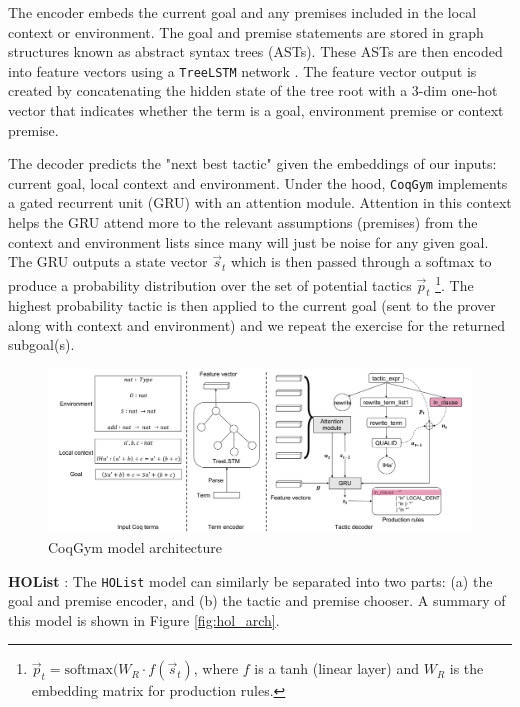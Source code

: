 \documentclass{article}
\begin{document}
The encoder embeds the current goal and any premises included in the local context or environment. The goal and premise statements are stored in graph structures known as abstract syntax trees (ASTs). These ASTs are then encoded into feature vectors using a \texttt{TreeLSTM} network \cite{TreeLSTM}. The feature vector output is created by concatenating the hidden state of the tree root with a 3-dim one-hot vector that indicates whether the term is a goal, environment premise or context premise.

The decoder predicts the "next best tactic" given the embeddings of our inputs: current goal, local context and environment. Under the hood, \texttt{CoqGym} implements a gated recurrent unit (GRU) with an attention module. Attention in this context helps the GRU attend more to the relevant assumptions (premises) from the context and environment lists since many will just be noise for any given goal. The GRU outputs a state vector $\vec{s}_t$ which is then passed through a softmax to produce a probability distribution over the set of potential tactics  $\vec{p}_t$ \footnote{$\vec{p}_t = \text{softmax} (W_R \cdot f(\vec{s}_t)$, where $f$ is a tanh (linear layer) and $W_R$ is the embedding matrix for production rules. }. The highest probability tactic is then applied to the current goal (sent to the prover along with context and environment) and we repeat the exercise for the returned subgoal(s). 

\begin{figure}[H]
    \centering
    \includegraphics[width=1\textwidth]{images/coqgym.png}
    \caption{CoqGym model architecture \cite{coqgym}}
    \label{fig:coq_arch}
\end{figure}

\textbf{HOList} \cite{hol}: The \texttt{HOList} model can similarly be separated into two parts: (a) the goal and premise encoder, and (b) the tactic and premise chooser. A summary of this model is shown in Figure \ref{fig:hol_arch}.
\end{document}
